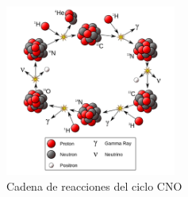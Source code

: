 \begin{figure}
	\centering
	\includegraphics[width=0.5\textwidth]{img/tesis/ciclo CNO.png}
	\caption {Cadena de reacciones del ciclo CNO}
	\label{fig:ciclo-cno}
\end{figure}


\endinput
